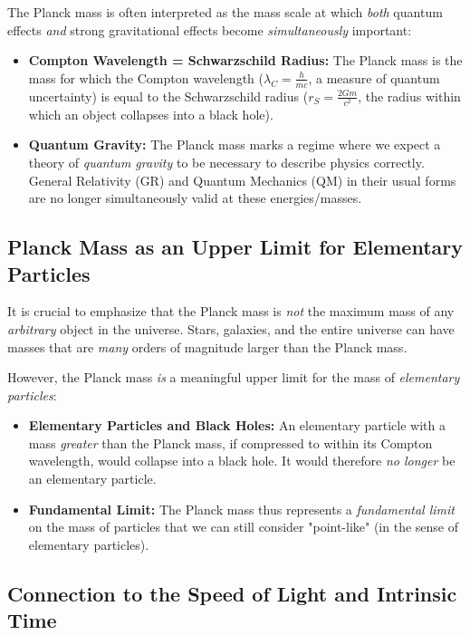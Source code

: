 \documentclass{article}
\begin{document}
	The Planck mass is often interpreted as the mass scale at which \textit{both} quantum effects \textit{and} strong gravitational effects become \textit{simultaneously} important:
	
	\begin{itemize}
		\item \textbf{Compton Wavelength = Schwarzschild Radius:} The Planck mass is the mass for which the Compton wavelength ($\lambda_C = \frac{h}{mc}$, a measure of quantum uncertainty) is equal to the Schwarzschild radius ($r_S = \frac{2Gm}{c^2}$, the radius within which an object collapses into a black hole).
		\item \textbf{Quantum Gravity:} The Planck mass marks a regime where we expect a theory of \textit{quantum gravity} to be necessary to describe physics correctly. General Relativity (GR) and Quantum Mechanics (QM) in their usual forms are no longer simultaneously valid at these energies/masses.
	\end{itemize}
	
	\subsection{Planck Mass as an Upper Limit for Elementary Particles}
	
	It is crucial to emphasize that the Planck mass is \textit{not} the maximum mass of any \textit{arbitrary} object in the universe. Stars, galaxies, and the entire universe can have masses that are \textit{many} orders of magnitude larger than the Planck mass.
	
	However, the Planck mass \textit{is} a meaningful upper limit for the mass of \textit{elementary particles}:
	
	\begin{itemize}
		\item \textbf{Elementary Particles and Black Holes:} An elementary particle with a mass \textit{greater} than the Planck mass, if compressed to within its Compton wavelength, would collapse into a black hole. It would therefore \textit{no longer} be an elementary particle.
		\item \textbf{Fundamental Limit:} The Planck mass thus represents a \textit{fundamental limit} on the mass of particles that we can still consider "point-like" (in the sense of elementary particles).
	\end{itemize}
	
	\subsection{Connection to the Speed of Light and Intrinsic Time}
	
\end{document}
